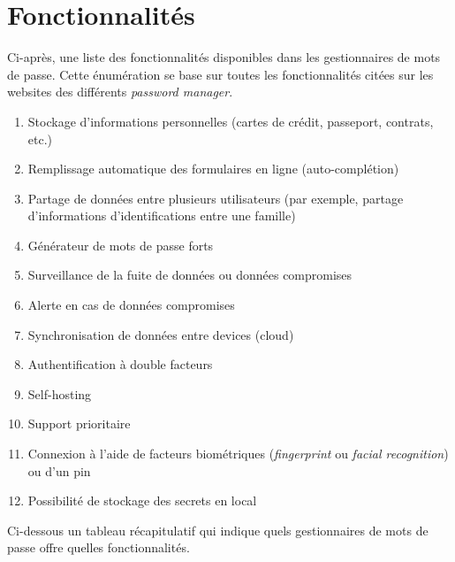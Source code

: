 \section{Fonctionnalités}
Ci-après, une liste des fonctionnalités disponibles dans les gestionnaires de mots de passe. Cette énumération se base sur toutes les fonctionnalités citées sur les websites des différents \textit{password manager}. \\
\begin{enumerate}
\item Stockage d'informations personnelles (cartes de crédit, passeport, contrats, etc.)
\item Remplissage automatique des formulaires en ligne (auto-complétion)
\item Partage de données entre plusieurs utilisateurs (par exemple, partage d'informations d'identifications entre une famille)
\item Générateur de mots de passe forts
\item Surveillance de la fuite de données ou données compromises
\item Alerte en cas de données compromises
\item Synchronisation de données entre devices (cloud)
\item Authentification à double facteurs
\item Self-hosting
\item Support prioritaire
\item Connexion à l'aide de facteurs biométriques (\textit{fingerprint} ou \textit{facial recognition}) ou d'un pin
\item Possibilité de stockage des secrets en local

\end{enumerate}
Ci-dessous un tableau récapitulatif qui indique quels gestionnaires de mots de passe offre quelles fonctionnalités. 
